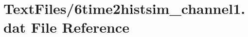 \hypertarget{6time2histsim__channel1_8dat}{}\section{Text\+Files/6time2histsim\+\_\+channel1.dat File Reference}
\label{6time2histsim__channel1_8dat}
